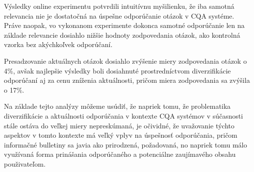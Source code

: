 Výsledky online experimentu potvrdili intuitívnu myšilienku, že iba samotná relevancia nie je dostatočná na úspešne
odporúčanie otázok v CQA systéme. Práve naopak, vo vykonanom experimente dokonca samotné odporúčanie len na základe
relevancie dosiahlo nižšie hodnoty zodpovedania otázok, ako kontrolná vzorka bez akýchkoľvek odporúčaní.

Presadzovanie aktuálnych otázok dosiahlo zvýšenie miery zodpovedania otázok o 4\%, avšak najlepšie výsledky boli dosiahnuté
prostredníctvom diverzifikácie odporúčaní aj za cenu zníženia aktuálnosti, pričom miera zodpovedania sa zvýšila o 17\%.

\vspace*{1.5cm}

Na základe tejto analýzy môžeme usúdiť, že napriek tomu, že problematika diverzifikácie a aktuálnosti odporúčania v kontexte
CQA systémov v súčasnosti stále ostáva do veľkej miery nepreskúmaná, je očividné, že uvažovanie týchto aspektov v tomto
kontexte má veľký vplyv na úspešnosť odporúčania, pričom informačné bulletiny sa javia ako prirodzená, požadovaná,
no napriek tomu málo využívaná forma prinášania odporúčaného a potenciálne zaujímavého obsahu použivateľom.
